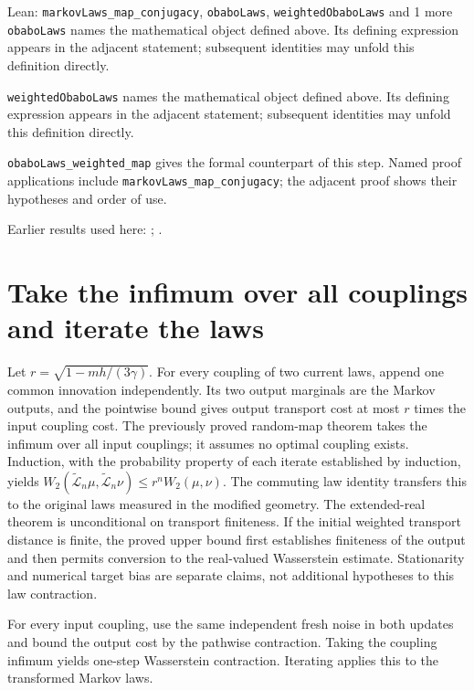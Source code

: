 \documentclass[11pt,a4paper]{article}
\begin{document}
\begin{leanbox}{Lean: \texttt{markovLaws\_\allowbreak{}map\_\allowbreak{}conjugacy}, \texttt{obaboLaws}, \texttt{weightedObaboLaws} and 1 more}
\texttt{obabo\allowbreak{}Laws} names the mathematical object defined above. Its defining expression appears in the adjacent statement; subsequent identities may unfold this definition directly.




\texttt{weighted\allowbreak{}Obabo\allowbreak{}Laws} names the mathematical object defined above. Its defining expression appears in the adjacent statement; subsequent identities may unfold this definition directly.




\texttt{obabo\allowbreak{}Laws\_\allowbreak{}weighted\_\allowbreak{}map} gives the formal counterpart of this step. Named proof applications include \texttt{markov\allowbreak{}Laws\_\allowbreak{}map\_\allowbreak{}conjugacy}; the adjacent proof shows their hypotheses and order of use.
\end{leanbox}


Earlier results used here: \cite[Section~3.33.11]{LangevinLean2026ULASC}; \cite[Section~3.33.6]{LangevinLean2026ULASC}.

\section{\texorpdfstring{Take the infimum over all couplings and iterate the laws}{Take the infimum over all couplings and iterate the laws}}


Let \(r=\sqrt{1-mh/(3\gamma)}\). For every coupling of two current laws, append one common innovation independently. Its two output marginals are the Markov outputs, and the pointwise bound gives output transport cost at most \(r\) times the input coupling cost. The previously proved random-map theorem takes the infimum over all input couplings; it assumes no optimal coupling exists. Induction, with the probability property of each iterate established by induction, yields \(W_2(\widetilde{\mathcal L}_n\mu,\widetilde{\mathcal L}_n\nu)\le r^nW_2(\mu,\nu)\). The commuting law identity transfers this to the original laws measured in the modified geometry. The extended-real theorem is unconditional on transport finiteness. If the initial weighted transport distance is finite, the proved upper bound first establishes finiteness of the output and then permits conversion to the real-valued Wasserstein estimate. Stationarity and numerical target bias are separate claims, not additional hypotheses to this law contraction.



For every input coupling, use the same independent fresh noise in both updates and bound the output cost by the pathwise contraction. Taking the coupling infimum yields one-step Wasserstein contraction. Iterating applies this to the transformed Markov laws.
\end{document}
